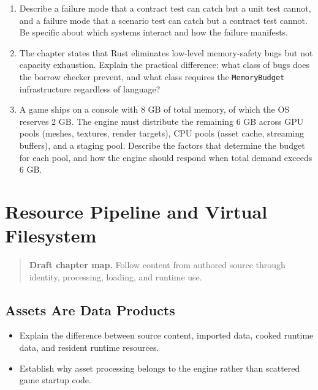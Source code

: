 \documentclass[
  11pt,
  letterpaper,
  DIV=11,
  numbers=noendperiod,
  twoside,
  open=right]{scrreprt}
\providecommand{\tightlist}{%
  \setlength{\itemsep}{0pt}\setlength{\parskip}{0pt}}
\begin{document}
\begin{enumerate}
  The \texttt{BudgetRegistry} ensures that every \texttt{MemoryBudget}
  automatically publishes its state as instrumentation gauges. Why is
  this structural guarantee (enforced by the constructor API) preferable
  to a convention (documented in a coding standard)?
\item
  Describe a failure mode that a contract test can catch but a unit test
  cannot, and a failure mode that a scenario test can catch but a
  contract test cannot. Be specific about which systems interact and how
  the failure manifests.
\item
  The chapter states that Rust eliminates low-level memory-safety bugs
  but not capacity exhaustion. Explain the practical difference: what
  class of bugs does the borrow checker prevent, and what class requires
  the \texttt{MemoryBudget} infrastructure regardless of language?
\item
  A game ships on a console with 8 GB of total memory, of which the OS
  reserves 2 GB. The engine must distribute the remaining 6 GB across
  GPU pools (meshes, textures, render targets), CPU pools (asset cache,
  streaming buffers), and a staging pool. Describe the factors that
  determine the budget for each pool, and how the engine should respond
  when total demand exceeds 6 GB.
\end{enumerate}

\chapter{Resource Pipeline and Virtual
Filesystem}\label{resource-pipeline-and-virtual-filesystem}

\begin{quote}
\textbf{Draft chapter map.} Follow content from authored source through
identity, processing, loading, and runtime use.
\end{quote}

\section{Assets Are Data Products}\label{assets-are-data-products}

\begin{itemize}
\tightlist
\item
  Explain the difference between source content, imported data, cooked
  runtime data, and resident runtime resources.
\item
  Establish why asset processing belongs to the engine rather than
  scattered game startup code.
\end{itemize}
\end{document}
